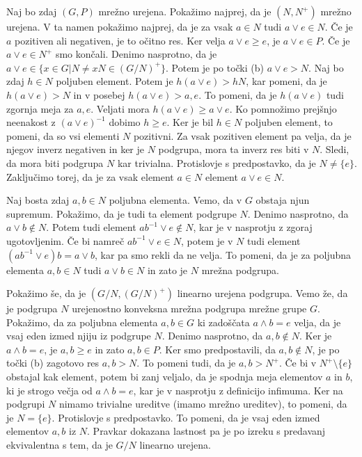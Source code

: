 \documentclass[a4paper, 12pt]{article}
\begin{document}
\begin{enumerate}
Naj bo zdaj $(G,P)$ mrežno urejena. Pokažimo najprej, da je $(N,N^+)$ mrežno urejena. V ta namen pokažimo najprej, da je za vsak $a\in N$
 tudi $a\lor e\in N$. Če je $a$ pozitiven ali negativen, je to očitno res. Ker velja $a\lor e \ge e$, je $a\lor e \in P$. Če je $a\lor e \in N^+$ smo končali. Denimo nasprotno, da je $a\lor e \in \{x\in G| N\neq xN \in (G/N)^+\}$. Potem je po točki (b) $a\lor e > N$. Naj bo zdaj $h\in N$ poljuben element. Potem je $h(a\lor e) > hN$, kar pomeni, da je $h(a\lor e) >N$ in v posebej $h(a\lor e) > a,e$. To pomeni, da je $h(a\lor e)$ tudi zgornja meja za $a,e$. Veljati mora $h(a\lor e ) \ge a \lor e$. Ko pomnožimo prejšnjo neenakost z $(a\lor e)^{-1}$ dobimo $h\ge e$. Ker je bil $h\in N$ poljuben element, to pomeni, da so vsi elementi $N$ pozitivni. Za vsak pozitiven element pa velja, da je njegov inverz negativen in ker je $N$ podgrupa, mora ta inverz res biti v $N$. Sledi, da mora biti podgrupa $N$ kar trivialna. Protislovje s predpostavko, da je $N\neq \{e\}$. Zaključimo torej, da je za vsak element $a\in N$ element $a\lor e \in N$.

Naj bosta zdaj $a,b\in N$ poljubna elementa. Vemo, da v $G$ obstaja njun supremum. Pokažimo, da je tudi ta element podgrupe $N$. Denimo nasprotno, da $a\lor b\notin N$. Potem tudi element $ab^{-1} \lor e\notin N$, kar je v nasprotju z zgoraj ugotovljenim. Če bi namreč $ab^{-1} \lor e\in N$, potem je v $N$ tudi element $(ab^{-1} \lor e)b = a \lor b$, kar pa smo rekli da ne velja. To pomeni, da je za poljubna elementa $a,b\in N$ tudi $a\lor b\in N$ in zato je $N$ mrežna podgrupa.

Pokažimo še, da je $(G/N,(G/N)^+)$ linearno urejena podgrupa. Vemo že, da je podgrupa $N$ urejenostno konveksna mrežna podgrupa mrežne grupe $G$. Pokažimo, da za poljubna elementa $a,b\in G$ ki zadoščata $a\land b = e$ velja, da je vsaj eden izmed njiju iz podgrupe $N$. Denimo nasprotno, da $a,b\notin N$. Ker je $a\land b = e$, je $a,b\ge e$ in zato $a,b\in P$. Ker smo predpostavili, da $a,b\notin N$, je po točki (b) zagotovo res $a,b>N$. To pomeni tudi, da je $a,b>N^+$. Če bi v $N^+\setminus\{e\}$ obstajal kak element, potem bi zanj veljalo, da je spodnja meja elementov $a$ in $b$, ki je strogo večja od $a\land b =e$, kar je v nasprotju z definicijo infimuma. Ker na podgrupi $N$ nimamo trivialne ureditve (imamo mrežno ureditev), to pomeni, da je $N=\{e\}$. Protislovje s predpostavko. To pomeni, da je vsaj eden izmed elementov $a,b$ iz $N$. Pravkar dokazana lastnost pa je po izreku s predavanj ekvivalentna s tem, da je $G/N$ linearno urejena.


\end{enumerate}
\end{document}
